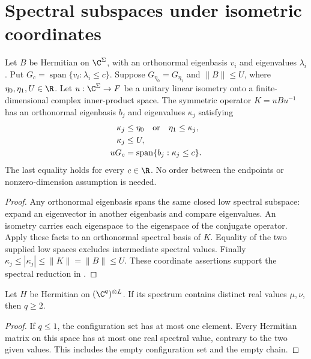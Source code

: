 \section{Spectral subspaces under isometric coordinates}

\begin{theorem}
    \label{thm:canonical_isometric_spectral_data}
    \leanok
    Let $B$ be Hermitian on $\C^\Sigma$, with an orthonormal eigenbasis
    $v_i$ and eigenvalues $\lambda_i$. Put
    $G_c=\operatorname{span}\{v_i:\lambda_i\le c\}$.
    Suppose $G_{\eta_0}=G_{\eta_1}$ and $\|B\|\le U$, where
    $\eta_0,\eta_1,U\in\R$. Let $u:\C^\Sigma\to F$ be a unitary linear
    isometry onto a finite-dimensional complex inner-product space.
    The symmetric operator $K=uBu^{-1}$ has an orthonormal
    eigenbasis $b_j$ and eigenvalues $\kappa_j$ satisfying
    \begin{align}
        \kappa_j & \le\eta_0\quad\text{or}\quad\eta_1\le\kappa_j,\notag \\
        \kappa_j & \le U,\notag                                         \\
        uG_c     & =\operatorname{span}\{b_j:\kappa_j\le c\}.
    \end{align}
    The last equality holds for every $c\in\R$. No order between the
    endpoints or nonzero-dimension assumption is needed.
\end{theorem}
\begin{proof}\leanok
    Any orthonormal eigenbasis spans the same closed low spectral subspace:
    expand an eigenvector in another eigenbasis and compare eigenvalues.
    An isometry carries each eigenspace to the eigenspace of the conjugate
    operator. Apply these facts to an orthonormal spectral basis of $K$.
    Equality of the two supplied low spaces excludes intermediate spectral
    values. Finally $\kappa_j\le|\kappa_j|\le\|K\|=\|B\|\le U$.
    These coordinate assertions support the spectral reduction in
    \cite[Theorem 4.2 and Lemma 2.9]{Arad2016RigorousRG}.
\end{proof}

\begin{theorem}
    \label{thm:two_spectral_values_local_dimension}
    \leanok
    Let $H$ be Hermitian on $(\C^q)^{\otimes L}$. If its spectrum contains
    distinct real values $\mu,\nu$, then $q\ge2$.
\end{theorem}
\begin{proof}\leanok
    If $q\le1$, the configuration set has at most one element. Every
    Hermitian matrix on this space has at most one real spectral value,
    contrary to the two given values. This includes the empty configuration
    set and the empty chain.
\end{proof}

